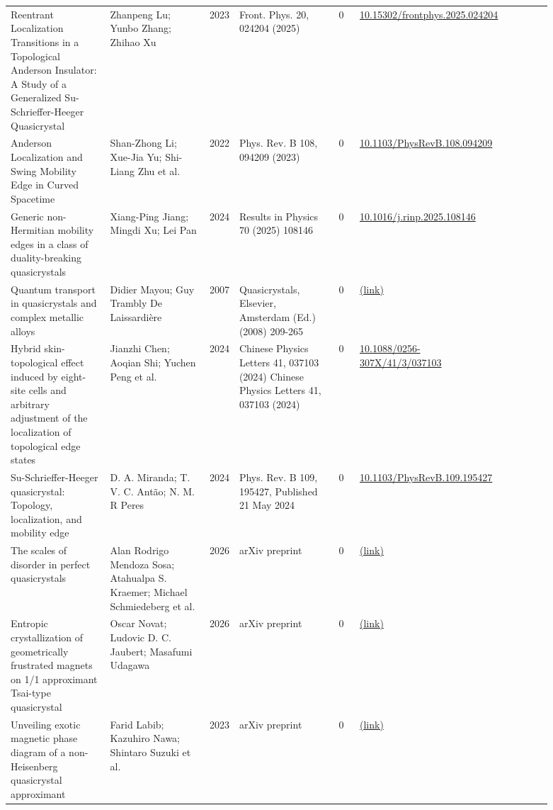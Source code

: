 \documentclass[10pt,a4paper]{article}
\begin{document}
{\begin{longtable}{p{0.192\linewidth}p{0.192\linewidth}p{0.043\linewidth}p{0.192\linewidth}p{0.043\linewidth}p{0.132\linewidth}p{0.096\linewidth}}
Reentrant Localization Transitions in a Topological Anderson Insulator: A Study of a Generalized Su-Schrieffer-Heeger Quasicrystal & Zhanpeng Lu; Yunbo Zhang; Zhihao Xu & 2023 & Front. Phys. 20, 024204 (2025) & 0 & \href{https://doi.org/10.15302/frontphys.2025.024204}{10.15302/frontphys.2025.024204} &  \\
Anderson Localization and Swing Mobility Edge in Curved Spacetime & Shan-Zhong Li; Xue-Jia Yu; Shi-Liang Zhu et al. & 2022 & Phys. Rev. B 108, 094209 (2023) & 0 & \href{https://doi.org/10.1103/PhysRevB.108.094209}{10.1103/PhysRevB.108.094209} &  \\
Generic non-Hermitian mobility edges in a class of duality-breaking quasicrystals & Xiang-Ping Jiang; Mingdi Xu; Lei Pan & 2024 & Results in Physics 70 (2025) 108146 & 0 & \href{https://doi.org/10.1016/j.rinp.2025.108146}{10.1016/j.rinp.2025.108146} &  \\
Quantum transport in quasicrystals and complex metallic alloys & Didier Mayou; Guy Trambly De Laissardière & 2007 & Quasicrystals, Elsevier, Amsterdam (Ed.) (2008) 209-265 & 0 & \href{http://arxiv.org/abs/cond-mat/0701639v1}{(link)} &  \\
Hybrid skin-topological effect induced by eight-site cells and arbitrary adjustment of the localization of topological edge states & Jianzhi Chen; Aoqian Shi; Yuchen Peng et al. & 2024 & Chinese Physics Letters 41, 037103 (2024) Chinese Physics Letters 41, 037103 (2024) & 0 & \href{https://doi.org/10.1088/0256-307X/41/3/037103}{10.1088/0256-307X/41/3/037103} &  \\
Su-Schrieffer-Heeger quasicrystal: Topology, localization, and mobility edge & D. A. Miranda; T. V. C. Antão; N. M. R Peres & 2024 & Phys. Rev. B 109, 195427, Published 21 May 2024 & 0 & \href{https://doi.org/10.1103/PhysRevB.109.195427}{10.1103/PhysRevB.109.195427} &  \\
The scales of disorder in perfect quasicrystals & Alan Rodrigo Mendoza Sosa; Atahualpa S. Kraemer; Michael Schmiedeberg et al. & 2026 & arXiv preprint & 0 & \href{http://arxiv.org/abs/2607.09274v1}{(link)} &  \\
Entropic crystallization of geometrically frustrated magnets on 1/1 approximant Tsai-type quasicrystal & Oscar Novat; Ludovic D. C. Jaubert; Masafumi Udagawa & 2026 & arXiv preprint & 0 & \href{http://arxiv.org/abs/2604.02180v1}{(link)} &  \\
Unveiling exotic magnetic phase diagram of a non-Heisenberg quasicrystal approximant & Farid Labib; Kazuhiro Nawa; Shintaro Suzuki et al. & 2023 & arXiv preprint & 0 & \href{http://arxiv.org/abs/2310.14291v1}{(link)} &  \\

\end{longtable}}
\end{document}

